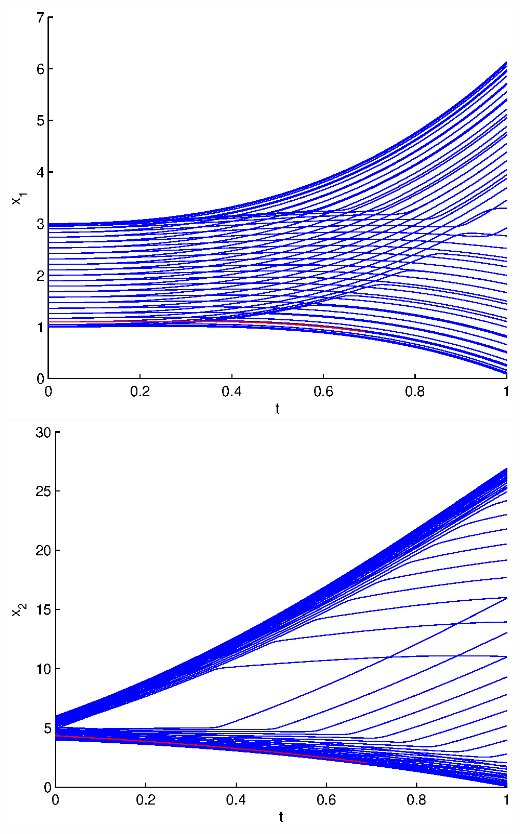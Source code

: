 \documentclass[11pt]{article}
\begin{document}
\includegraphics[scale=0.6]{pics/pic1_x1.eps}
\includegraphics[scale=0.6]{pics/pic1_x2.eps}
\end{document}
